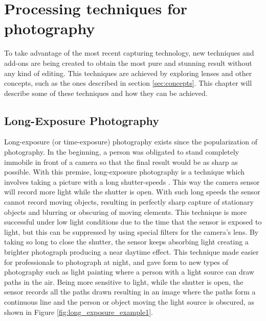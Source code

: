 \section{Processing techniques for photography}
\label{sub:photo_techniques}

To take advantage of the most recent capturing technology, new techniques and add-ons are being created to obtain the most pure and stunning result without any kind of editing. This techniques are achieved by exploring lenses and other concepts, such as the ones described in section \ref{sec:concepts}. This chapter will describe some of these techniques and how they can be achieved.


\subsection{Long-Exposure Photography}

Long-exposure (or time-exposure) photography exists since the popularization of photography. In the beginning, a person was obligated to stand completely immobile in front of a camera so that the final result would be as sharp as possible.
With this premise, long-exposure photography is a technique which involves taking a picture with a long shutter-speeds \cite{Kamps2012}. This way the camera sensor will record more light while the shutter is open. With such long speeds the sensor cannot record moving objects, resulting in perfectly sharp capture of stationary objects and blurring or obscuring of moving elements.
This technique is more successful under low light conditions due to the time that the sensor is exposed to light, but this can be suppressed by using special filters for the camera's lens. By taking so long to close the shutter, the sensor keeps absorbing light creating a brighter photograph producing a near daytime effect.
This technique made easier for professionals to photograph at night, and gave form to new types of photography such as light painting where a person with a light source can draw paths in the air. Being more sensitive to light, while the shutter is open, the sensor records all the paths drawn resulting in an image where the paths form a continuous line and the person or object moving the light source is obscured, as shown in Figure \ref{fig:long_exposure_example1}.


